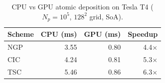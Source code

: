 \begin{table}[t]
\centering
\small
\caption{CPU vs GPU atomic deposition on Tesla T4 ($N_p=10^5$, $128^2$ grid, SoA).}
\label{tab:gpu_summary}
\begin{tabular}{lrrr}
\toprule
Scheme & CPU (ms) & GPU (ms) & Speedup \\
\midrule
NGP & 3.55 & 0.80 & 4.4$\times$ \\
CIC & 4.24 & 0.81 & 5.3$\times$ \\
TSC & 5.46 & 0.86 & 6.3$\times$ \\
\bottomrule
\end{tabular}
\end{table}
